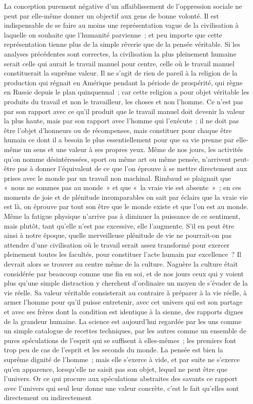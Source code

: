\documentclass[french,twoside]{book} %
\begin{document}
La conception purement négative d'un affaiblissement de l'oppression sociale ne peut par elle-même donner un objectif aux gens de bonne volonté. Il est indispensable de se faire au moins une représentation vague de la civilisation à laquelle on souhaite que l'humanité parvienne ; et peu importe que cette représentation tienne plus de la simple rêverie que de la pensée véritable. Si les analyses précédentes sont correctes, la civilisation la plus pleinement humaine serait celle qui aurait le travail manuel pour centre, celle où le travail manuel constituerait la suprême valeur. Il ne s'agit de rien de pareil à la religion de la production qui régnait en Amérique pendant la période de prospérité, qui règne en Russie depuis le plan quinquennal ; car cette religion a pour objet véritable les produits du travail et non le travailleur, les choses et non l'homme. Ce n'est pas par son rapport avec ce qu'il produit que le travail manuel doit devenir la valeur la plus haute, mais par son rapport avec l'homme qui l'exécute ; il ne doit pas être l'objet d'honneurs ou de récompenses, mais constituer pour chaque être humain ce dont il a besoin le plus essentiellement pour que sa vie prenne par elle-même un sens et une valeur à ses propres yeux. Même de nos jours, les activités qu'on nomme désintéressées, sport ou même art ou même pensée, n'arrivent peut-être pas à donner l'équivalent de ce que l'on éprouve à se mettre directement aux prises avec le monde par un travail non machinal. Rimbaud se plaignait que « nous ne sommes pas au monde » et que « la vraie vie est absente » ; en ces moments de joie et de plénitude incomparables on sait par éclairs que la vraie vie est là, on éprouve par tout son être que le monde existe et que l'on est au monde. Même la fatigue physique n'arrive pas à diminuer la puissance de ce sentiment, mais plutôt, tant qu'elle n'est pas excessive, elle l'augmente. S'il en peut être ainsi à notre époque, quelle merveilleuse plénitude de vie ne pourrait-on pas attendre d'une civilisation où le travail serait assez transformé pour exercer pleinement toutes les facultés, pour constituer l'acte humain par excellence ? Il devrait alors se trouver au centre même de la culture. Naguère la culture était considérée par beaucoup comme une fin en soi, et de nos jours ceux qui y voient plus qu'une simple distraction y cherchent d'ordinaire un moyen de s'évader de la vie réelle. Sa valeur véritable consisterait au contraire à préparer à la vie réelle, à armer l'homme pour qu'il puisse entretenir, avec cet univers qui est son partage et avec ses frères dont la condition est identique à la sienne, des rapports dignes de la grandeur humaine. La science est aujourd'hui regardée par les uns comme un simple catalogue de recettes techniques, par les autres comme un ensemble de pures spéculations de l'esprit qui se suffisent à elles-mêmes ; les premiers font trop peu de cas de l'esprit et les seconds du monde. La pensée est bien la suprême dignité de l'homme ; mais elle s'exerce à vide, et par suite ne s'exerce qu'en apparence, lorsqu'elle ne saisit pas son objet, lequel ne peut être que l'univers. Or ce qui procure aux spéculations abstraites des savants ce rapport avec l'univers qui seul leur donne une valeur concrète, c'est le fait qu'elles sont directement ou indirectement 
\end{document}
